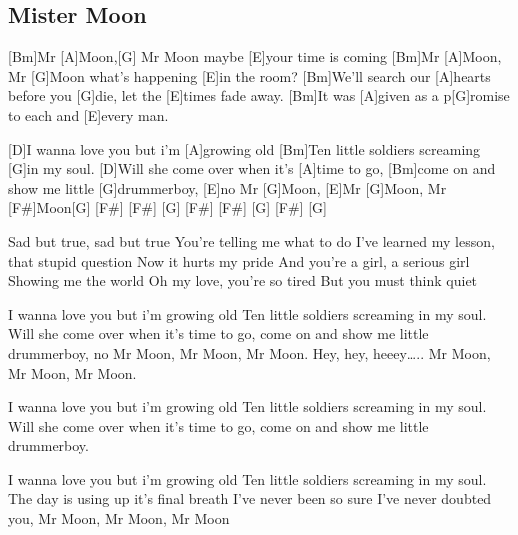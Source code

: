 \subsection*{Mister Moon   }
\begin{guitar}
[Bm] [A] [G] [E]


[Bm]Mr [A]Moon,[G] Mr Moon maybe [E]your time is coming
[Bm]Mr [A]Moon, Mr [G]Moon what's happening [E]in the room?
[Bm]We’ll search our [A]hearts before you [G]die, let the [E]times fade away.
[Bm]It was [A]given as a p[G]romise to each and [E]every man.

[D]I wanna love you but i’m [A]growing old
[Bm]Ten little soldiers screaming [G]in my soul.
[D]Will she come over when it’s [A]time to go,
[Bm]come on and show me little [G]drummerboy,
[E]no Mr [G]Moon, [E]Mr [G]Moon, Mr [F#]Moon[G]  [F#] [F#] [G] [F#]  [F#] [G] [F#] [G]


Sad but true, sad but true
You’re telling me what to do
I’ve learned my lesson, that stupid question
Now it hurts my pride
And you’re a girl, a serious girl
Showing me the world
Oh my love, you’re so tired
But you must think quiet


I wanna love you but i’m growing old
Ten little soldiers screaming in my soul.
Will she come over when it’s time to go,
come on and show me little
drummerboy, no
Mr Moon, Mr Moon, Mr Moon.
Hey, hey, heeey…..
Mr Moon, Mr Moon, Mr Moon.


I wanna love you but i’m growing old
Ten little soldiers screaming in my soul.
Will she come over when it’s time to go, come on and show me little
drummerboy.


I wanna love you but i’m growing old
Ten little soldiers screaming in my soul.
The day is using up it's final breath
I've never been so sure I've never doubted you,
Mr Moon, Mr Moon, Mr Moon
\end{guitar}

